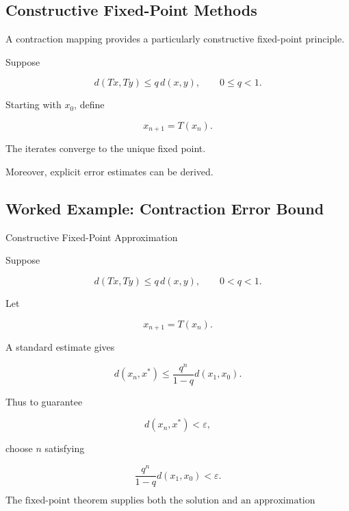 \subsection{Constructive Fixed-Point Methods}
\label{subsec:constructive-fixed-point-methods}

A contraction mapping provides a particularly constructive fixed-point
principle.

Suppose

\[
d(Tx,Ty)
\leq
q\,d(x,y),
\qquad
0\leq q<1.
\]

Starting with \(x_0\), define

\[
\boxed{
x_{n+1}=T(x_n).
}
\]

The iterates converge to the unique fixed point.

Moreover, explicit error estimates can be derived.

\subsection{Worked Example: Contraction Error Bound}
\label{subsec:worked-contraction-error}

\begin{workedexamplebox}{Constructive Fixed-Point Approximation}

Suppose

\[
d(Tx,Ty)
\leq
q\,d(x,y),
\qquad
0<q<1.
\]

Let

\[
x_{n+1}=T(x_n).
\]

A standard estimate gives

\[
d(x_n,x^*)
\leq
\frac{q^n}{1-q}
d(x_1,x_0).
\]

Thus to guarantee

\[
d(x_n,x^*)<\varepsilon,
\]

choose \(n\) satisfying

\[
\frac{q^n}{1-q}
d(x_1,x_0)
<
\varepsilon.
\]

\begin{answerbox}
\[
\boxed{
\text{The fixed-point theorem supplies both the solution and an
approximation algorithm.}
}
\]
\end{answerbox}

\end{workedexamplebox}

